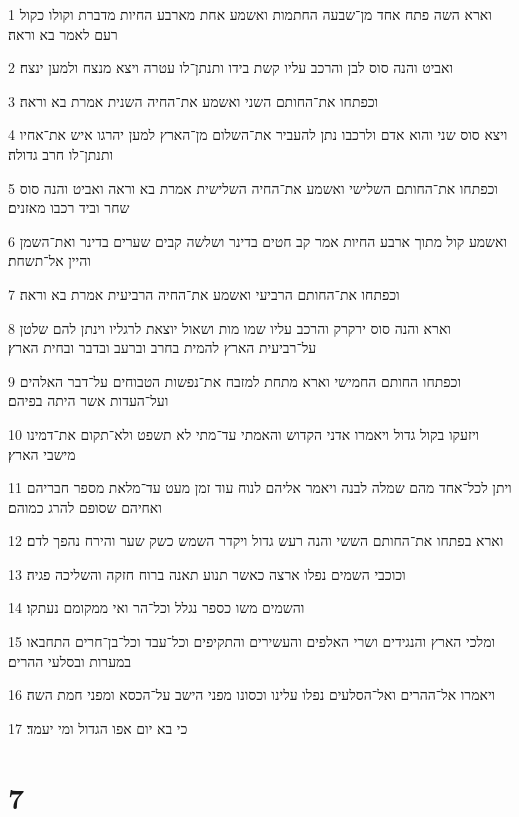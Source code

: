 \par 1 וארא השה פתח אחד מן־שבעה החתמות ואשמע אחת מארבע החיות מדברת וקולו כקול רעם לאמר בא וראה׃
\par 2 ואביט והנה סוס לבן והרכב עליו קשת בידו ותנתן־לו עטרה ויצא מנצח ולמען ינצח׃
\par 3 וכפתחו את־החותם השני ואשמע את־החיה השנית אמרת בא וראה׃
\par 4 ויצא סוס שני והוא אדם ולרכבו נתן להעביר את־השלום מן־הארץ למען יהרגו איש את־אחיו ותנתן־לו חרב גדולה׃
\par 5 וכפתחו את־החותם השלישי ואשמע את־החיה השלישית אמרת בא וראה ואביט והנה סוס שחר וביד רכבו מאזנים׃
\par 6 ואשמע קול מתוך ארבע החיות אמר קב חטים בדינר ושלשה קבים שערים בדינר ואת־השמן והיין אל־תשחת׃
\par 7 וכפתחו את־החותם הרביעי ואשמע את־החיה הרביעית אמרת בא וראה׃
\par 8 וארא והנה סוס ירקרק והרכב עליו שמו מות ושאול יוצאת לרגליו וינתן להם שלטן על־רביעית הארץ להמית בחרב וברעב ובדבר ובחית הארץ׃
\par 9 וכפתחו החותם החמישי וארא מתחת למזבח את־נפשות הטבוחים על־דבר האלהים ועל־העדות אשר היתה בפיהם׃
\par 10 ויזעקו בקול גדול ויאמרו אדני הקדוש והאמתי עד־מתי לא תשפט ולא־תקום את־דמינו מישבי הארץ׃
\par 11 ויתן לכל־אחד מהם שמלה לבנה ויאמר אליהם לנוח עוד זמן מעט עד־מלאת מספר חבריהם ואחיהם שסופם להרג כמוהם׃
\par 12 וארא בפתחו את־החותם הששי והנה רעש גדול ויקדר השמש כשק שער והירח נהפך לדם׃
\par 13 וכוכבי השמים נפלו ארצה כאשר תנוע תאנה ברוח חזקה והשליכה פגיה׃
\par 14 והשמים משו כספר נגלל וכל־הר ואי ממקומם נעתקו׃
\par 15 ומלכי הארץ והנגידים ושרי האלפים והעשירים והתקיפים וכל־עבד וכל־בן־חרים התחבאו במערות ובסלעי ההרים׃
\par 16 ויאמרו אל־ההרים ואל־הסלעים נפלו עלינו וכסונו מפני הישב על־הכסא ומפני חמת השה׃
\par 17 כי בא יום אפו הגדול ומי יעמד׃

\chapter{7}

